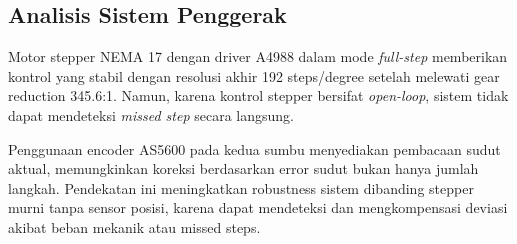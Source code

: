 

\subsection{Analisis Sistem Penggerak} \label{IV.AnalisisMotor}
Motor stepper NEMA 17 dengan driver A4988 dalam mode \textit{full-step} memberikan kontrol yang stabil dengan resolusi akhir 192 steps/degree setelah melewati gear reduction 345.6:1. Namun, karena kontrol stepper bersifat \textit{open-loop}, sistem tidak dapat mendeteksi \textit{missed step} secara langsung. \par

Penggunaan encoder AS5600 pada kedua sumbu menyediakan pembacaan sudut aktual, memungkinkan koreksi berdasarkan error sudut bukan hanya jumlah langkah. Pendekatan ini meningkatkan robustness sistem dibanding stepper murni tanpa sensor posisi, karena dapat mendeteksi dan mengkompensasi deviasi akibat beban mekanik atau missed steps. \par

